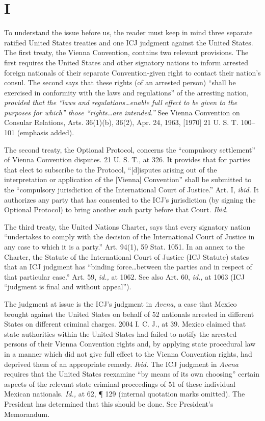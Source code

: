 \section{I}

  To understand the issue before us, the reader must keep in mind three
separate ratified United States treaties and one ICJ judgment against
the United States. The first treaty, the Vienna Convention, contains
two relevant provisions. The first requires the United States and other
signatory nations to inform arrested foreign nationals of their separate
Convention-given right to contact their nation's consul. The second
says that these rights (of an arrested person) ``shall be exercised in
conformity with the laws and regulations'' of the arresting nation,
\emph{provided that the ``laws and regulations\dots enable full effect
to be given to the purposes for which'' those ``rights\dots are
intended.''} See Vienna Convention on Consular Relations, Arts.
36(1)(b), 36(2), Apr. 24, 1963, [1970] 21 U. S. T. 100--101 (emphasis
added).

  The second treaty, the Optional Protocol, concerns the ``compulsory
settlement'' of Vienna Convention disputes. 21 U. S. T., at 326.
It provides that for parties that elect to subscribe to the Protocol,
``[d]isputes arising out of the interpretation or application of
the [Vienna] Convention'' shall be submitted to the ``compulsory
jurisdiction of the International Court of Justice.'' Art. I,
\emph{ibid.} It authorizes any party that has consented to the ICJ's
jurisdiction (by signing the Optional Protocol) to bring another such
party before that Court. \emph{Ibid.}

  The third treaty, the United Nations Charter, says that every
signatory nation ``undertakes to comply with the decision of the
International Court of Justice in any case to \newpage  which it is a
party.'' Art. 94(1), 59 Stat. 1051. In an annex to the Charter,
the Statute of the International Court of Justice (ICJ Statute) states
that an ICJ judgment has ``binding force\dots between the parties
and in respect of that particular case.'' Art. 59, \emph{id.,} at 1062.
See also Art. 60, \emph{id.,} at 1063 (ICJ ``judgment is final and without
appeal'').

  The judgment at issue is the ICJ's judgment in \emph{Avena,} a case
that Mexico brought against the United States on behalf of 52 nationals
arrested in different States on different criminal charges. 2004
I. C. J., at 39. Mexico claimed that state authorities within the
United States had failed to notify the arrested persons of their Vienna
Convention rights and, by applying state procedural law in a manner
which did not give full effect to the Vienna Convention rights, had
deprived them of an appropriate remedy. \emph{Ibid.} The ICJ judgment
in \emph{Avena} requires that the United States reexamine ``by means of
its own choosing'' certain aspects of the relevant state criminal
proceedings of 51 of these individual Mexican nationals. \emph{Id.,}
at 62, ¶ 129 (internal quotation marks omitted). The President has
determined that this should be done. See President's Memorandum.

